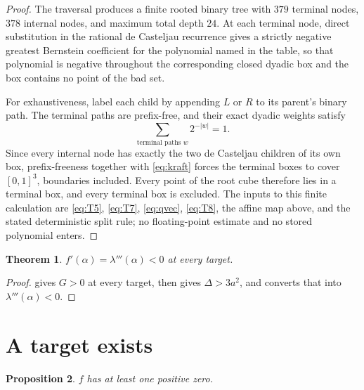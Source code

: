 \documentclass[11pt,reqno]{amsart}
\theoremstyle{plain}
\newtheorem{theorem}{Theorem}[section]
\newtheorem{proposition}[theorem]{Proposition}
\theoremstyle{definition}
\theoremstyle{remark}
\numberwithin{equation}{section}
\begin{document}
\begin{proof}
  The traversal produces a finite rooted binary tree with $379$ terminal
  nodes, $378$ internal nodes, and maximum total depth $24$. At each
  terminal node, direct substitution in the rational de Casteljau
  recurrence gives a strictly negative greatest Bernstein coefficient for
  the polynomial named in the table, so that polynomial is negative
  throughout the corresponding closed dyadic box and the box contains no
  point of the bad set.

  For exhaustiveness, label each child by appending $L$ or $R$ to its
  parent's binary path. The terminal paths are prefix-free, and their exact
  dyadic weights satisfy
  \begin{equation}
    \label{eq:kraft}
    \sum_{\text{terminal paths }w}2^{-|w|}=1 .
  \end{equation}
  Since every internal node has exactly the two de Casteljau children of
  its own box, prefix-freeness together with \eqref{eq:kraft} forces the
  terminal boxes to cover $[0,1]^3$, boundaries included. Every point of
  the root cube therefore lies in a terminal box, and every terminal box is
  excluded. The inputs to this finite calculation are \eqref{eq:T5},
  \eqref{eq:T7}, \eqref{eq:qvec}, \eqref{eq:T8}, the affine map above, and
  the stated deterministic split rule; no floating-point estimate and no
  stored polynomial enters.
\end{proof}

\begin{theorem}
  \label{thm:transversal}
  $f'(\alpha)=\lambda'''(\alpha)<0$ at every target.
\end{theorem}

\begin{proof}
   gives $G>0$ at every target,  then
  gives $\Delta>3a^2$, and  converts that into
  $\lambda'''(\alpha)<0$.
\end{proof}

\section{A target exists}
\label{sec:existence}

\begin{proposition}
  \label{prop:existence}
  $f$ has at least one positive zero.
\end{proposition}
\end{document}
